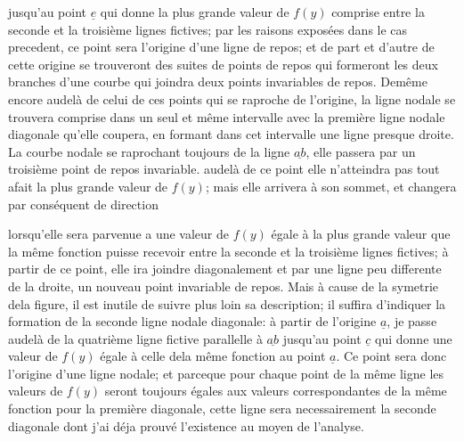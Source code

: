 \documentclass[11pt,a4paper]{article}
\begin{document}
jusqu'au point $\underline{e}$ qui donne la plus grande valeur
de $f(y)$ comprise entre la seconde et la troisième lignes
fictives; par les raisons exposées dans le cas precedent, ce
point sera l'origine d'une ligne de repos; et de part et
d'autre de cette origine se trouveront des suites de points
de repos qui formeront les deux branches d'une courbe
qui joindra deux points invariables de repos. Demême
encore audelà de celui de ces points qui se raproche
de l'origine, la ligne nodale se trouvera comprise
dans un seul et même intervalle avec la première
ligne nodale diagonale qu'elle coupera, en formant
dans cet intervalle une ligne presque droite. La courbe
nodale se raprochant toujours de la ligne $\underline{ab}$, elle
passera par un troisième point de repos invariable.
audelà de ce point elle n'atteindra pas tout afait
la plus grande valeur de $f(y)$; mais elle arrivera à
son sommet, et changera par conséquent de direction


lorsqu'elle sera parvenue a une valeur de $f(y)$ égale à la plus grande valeur
que la même fonction puisse recevoir entre la seconde et la troisième
lignes fictives;  à partir de ce point, elle ira joindre diagonalement
et par une ligne peu differente de la droite, un nouveau point
invariable de repos. Mais à cause de la symetrie dela figure,
il est inutile de suivre plus loin sa description; il suffira
d'indiquer la formation de la seconde ligne nodale diagonale:
à partir de l'origine $\underline{a}$, je passe audelà de la quatrième ligne
fictive parallelle à $\underline{ab}$ jusqu'au point $\underline{c}$ qui donne une valeur
de $f(y)$ égale à celle dela même fonction au point $\underline{a}$. Ce point
sera donc l'origine d'une ligne nodale; et parceque pour chaque
point de la même ligne les valeurs de $f(y)$ seront toujours
égales aux valeurs correspondantes de la même fonction
pour la première diagonale, cette ligne sera necessairement
la seconde diagonale dont j'ai déja prouvé l'existence
au moyen de l'analyse.
\end{document}
